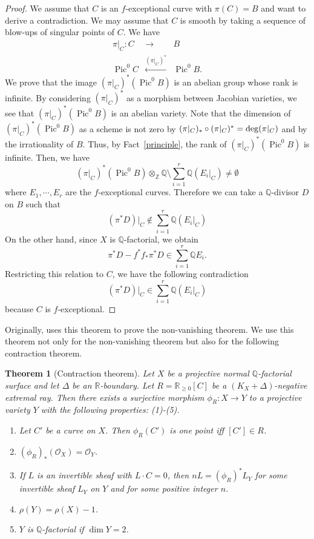\documentclass[12pt,twoside]{amsart}
\newcommand{\Pic}[0]{{\operatorname{Pic}}}
\newtheorem{thm}{Theorem}[section]
\theoremstyle{definition}
\newcommand{\Q}{$\mathbb{Q}$}
\begin{document}
\begin{proof}
We assume that $C$ is an $f$-exceptional curve with $\pi(C)=B$ and 
want to derive a contradiction. 
We may assume that $C$ is smooth by taking 
a sequence of blow-ups of singular points of $C$. 
We have 
\begin{eqnarray*}
\pi|_C:C&\longrightarrow& B\\
\Pic^0C &\overset{(\pi|_C)^*}\longleftarrow& \Pic^0B.
\end{eqnarray*}
We prove that the image $(\pi|_C)^*(\Pic^0B)$ is an abelian group whose rank is infinite. 
By considering $(\pi|_C)^*$ as a morphism between Jacobian varieties, 
we see that $(\pi|_C)^*(\Pic^0B)$ is an abelian variety. 
Note that the dimension of $(\pi|_C)^*(\Pic^0B)$ as a scheme is not zero 
by $(\pi|_C)_*\circ(\pi|_C)^*={\rm deg}(\pi|_C)$ and by the irrationality of $B$. 
Thus, by Fact~\ref{principle}, 
the rank of $(\pi|_C)^*(\Pic^0B)$ is infinite. 
Then, we have 
$$(\pi|_C)^*(\Pic^0B)\otimes_{\mathbb{Z}}\mathbb{Q}\setminus
\sum_{i=1}^{r}\mathbb{Q}(E_i|_C)\neq\emptyset$$
where $E_1,\cdots ,E_r$ are the $f$-exceptional curves. 
Therefore we can take a \Q-divisor $D$ on $B$ such that 
$$(\pi^*D)|_C \not\in\sum_{i=1}^{r}\mathbb{Q}(E_i|_C)$$
On the other hand, since $X$ is \Q-factorial, we obtain 
$$\pi^*D-f^*f_*\pi^*D\in\sum_{i=1}^{r}\mathbb{Q}E_i. $$
Restricting this relation to $C$, we have the following contradiction
$$(\pi^*D)|_C\in\sum_{i=1}^{r}\mathbb{Q}(E_i|_C) $$
because $C$ is $f$-exceptional. 
\end{proof}

Originally, \cite{Fujino} uses this theorem to prove the non-vanishing theorem. 
We use this theorem not only for the non-vanishing theorem 
but also for the following contraction theorem. 

\begin{thm}[Contraction theorem]\label{cont}
Let $X$ be a projective normal \Q-factorial surface and 
let $\Delta$ be an $\mathbb{R}$-boundary. 
Let $R=\mathbb{R}_{\geq 0}[C]$ be a $(K_X+\Delta)$-negative extremal ray. 
Then there exists a surjective morphism $\phi_R: X \to Y$ 
to a projective variety $Y$ with the following properties{\em{:}} 
{\em{(1)-(5)}}.
\begin{enumerate}
\item{Let $C'$ be a curve on $X$. 
Then $\phi_R(C')$ is one point iff $[C'] \in R$.}
\item{$(\phi_R)_*(\mathcal{O}_X)=\mathcal{O}_Y$.}
\item{If $L$ is an invertible sheaf with $L\cdot C=0$, 
then $nL=(\phi_R)^*L_Y$ for some invertible sheaf $L_Y$ on $Y$ and 
for some positive integer $n$.}
\item{$\rho(Y)=\rho(X)-1$.}
\item{$Y$ is \Q-factorial if $\dim Y=2$.}
\end{enumerate}
\end{thm}
\end{document}
